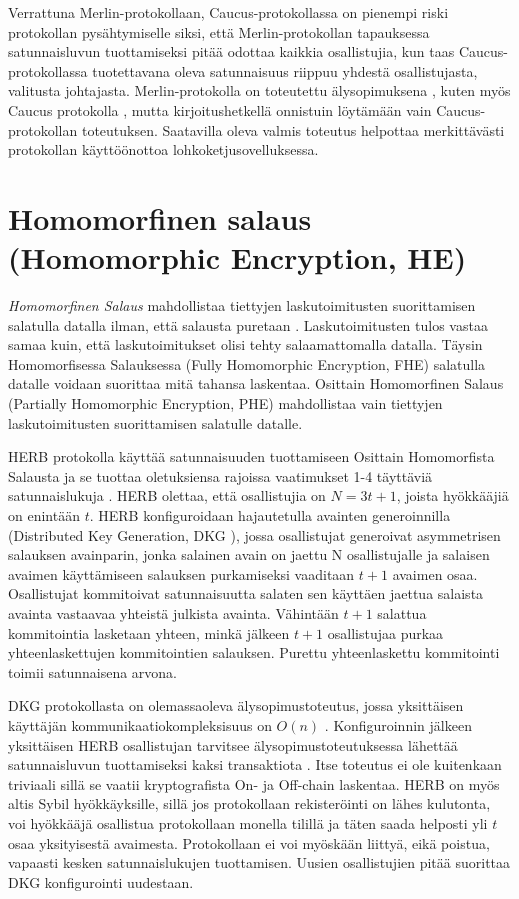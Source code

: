 Verrattuna Merlin-protokollaan, Caucus-protokollassa on pienempi riski protokollan pysähtymiselle siksi, että Merlin-protokollan tapauksessa satunnaisluvun tuottamiseksi pitää odottaa kaikkia osallistujia, kun taas Caucus-protokollassa tuotettavana oleva satunnaisuus riippuu yhdestä osallistujasta, valitusta johtajasta. Merlin-protokolla on toteutettu älysopimuksena  \cite{MerlinChains}, kuten myös Caucus protokolla \cite{Caucus}, mutta kirjoitushetkellä onnistuin löytämään vain Caucus-protokollan toteutuksen. Saatavilla oleva valmis toteutus helpottaa merkittävästi protokollan käyttöönottoa lohkoketjusovelluksessa.

\section{Homomorfinen salaus (Homomorphic Encryption, HE)}

\textit{Homomorfinen Salaus} mahdollistaa tiettyjen laskutoimitusten suorittamisen salatulla datalla ilman, että salausta puretaan \cite{alma9928100443506253}. Laskutoimitusten tulos vastaa samaa kuin, että laskutoimitukset olisi tehty salaamattomalla datalla. Täysin Homomorfisessa Salauksessa (Fully Homomorphic Encryption, FHE) salatulla datalle voidaan suorittaa mitä tahansa laskentaa. Osittain Homomorfinen Salaus (Partially Homomorphic Encryption, PHE) mahdollistaa vain tiettyjen laskutoimitusten suorittamisen salatulle datalle.

HERB protokolla käyttää satunnaisuuden tuottamiseen Osittain Homomorfista Salausta ja se tuottaa oletuksiensa rajoissa vaatimukset 1-4 täyttäviä satunnaislukuja \cite{cherniaeva2019homomorphic}. HERB olettaa, että osallistujia on $N=3t+1$, joista hyökkääjiä on enintään $t$. HERB konfiguroidaan hajautetulla avainten generoinnilla (Distributed Key Generation, DKG \cite{pedersen1991threshold}), jossa osallistujat generoivat asymmetrisen salauksen avainparin, jonka salainen avain on jaettu N osallistujalle ja salaisen avaimen käyttämiseen salauksen purkamiseksi vaaditaan $t+1$ avaimen osaa. Osallistujat kommitoivat satunnaisuutta salaten sen käyttäen jaettua salaista avainta vastaavaa yhteistä julkista avainta. Vähintään $t+1$ salattua kommitointia lasketaan yhteen, minkä jälkeen $t+1$ osallistujaa purkaa yhteenlaskettujen kommitointien salauksen. Purettu yhteenlaskettu kommitointi toimii satunnaisena arvona. 

DKG protokollasta on olemassaoleva älysopimustoteutus, jossa yksittäisen käyttäjän kommunikaatiokompleksisuus on $O(n)$ \cite{schindler2019ethdkg}. Konfiguroinnin jälkeen yksittäisen HERB osallistujan tarvitsee älysopimustoteutuksessa lähettää satunnaisluvun tuottamiseksi kaksi transaktiota \cite{cherniaeva2019homomorphic}. Itse toteutus ei ole kuitenkaan triviaali sillä se vaatii kryptografista On- ja Off-chain laskentaa. HERB on myös altis Sybil hyökkäyksille, sillä jos protokollaan rekisteröinti on lähes kulutonta, voi hyökkääjä osallistua protokollaan monella tilillä ja täten saada helposti yli $t$ osaa yksityisestä avaimesta. Protokollaan ei voi myöskään liittyä, eikä poistua, vapaasti kesken satunnaislukujen tuottamisen. Uusien osallistujien pitää suorittaa DKG konfigurointi uudestaan. 

